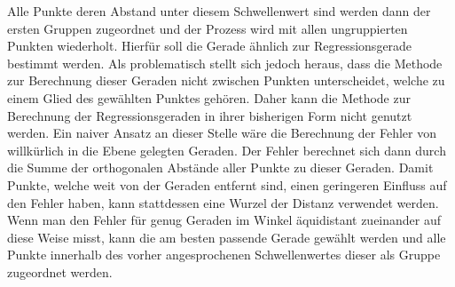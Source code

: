 Alle Punkte deren Abstand unter diesem Schwellenwert sind werden dann der ersten Gruppen zugeordnet und der Prozess wird mit allen ungruppierten Punkten wiederholt.
Hierfür soll die Gerade ähnlich zur Regressionsgerade bestimmt werden.
Als problematisch stellt sich jedoch heraus, dass die Methode zur Berechnung dieser Geraden nicht zwischen Punkten unterscheidet, welche zu einem Glied des gewählten Punktes gehören.
Daher kann die Methode zur Berechnung der Regressionsgeraden in ihrer bisherigen Form nicht genutzt werden.
Ein naiver Ansatz an dieser Stelle wäre die Berechnung der Fehler von willkürlich in die Ebene gelegten Geraden.
Der Fehler berechnet sich dann durch die Summe der orthogonalen Abstände aller Punkte zu dieser Geraden.
Damit Punkte, welche weit von der Geraden entfernt sind, einen geringeren Einfluss auf den Fehler haben, kann stattdessen eine Wurzel der Distanz verwendet werden.
Wenn man den Fehler für genug Geraden im Winkel äquidistant zueinander auf diese Weise misst, kann die am besten passende Gerade gewählt werden und alle Punkte innerhalb des vorher angesprochenen Schwellenwertes dieser als Gruppe zugeordnet werden.

